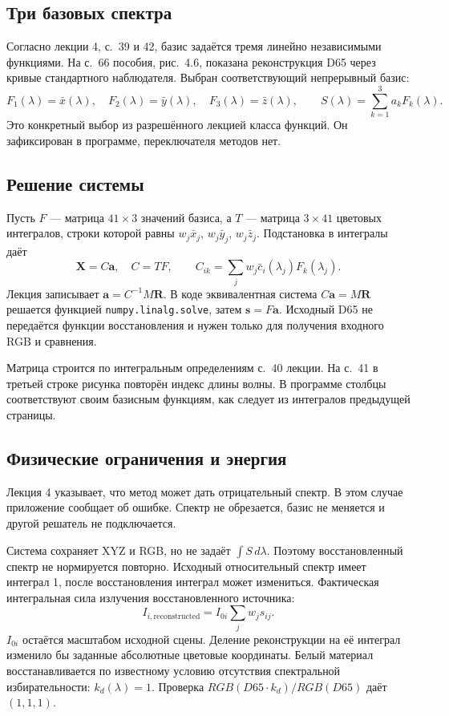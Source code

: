 \documentclass[a4paper,12pt]{article}
\newcommand{\code}[1]{\nolinkurl{#1}}
\begin{document}
\subsection{Три базовых спектра}
Согласно лекции 4, с.~39 и 42, базис задаётся тремя линейно независимыми функциями. На с.~66 пособия, рис.~4.6, показана реконструкция D65 через кривые стандартного наблюдателя. Выбран соответствующий непрерывный базис:
\[
 F_1(\lambda)=\bar x(\lambda),\quad F_2(\lambda)=\bar y(\lambda),\quad
 F_3(\lambda)=\bar z(\lambda),\qquad S(\lambda)=\sum_{k=1}^3a_kF_k(\lambda).
\]
Это конкретный выбор из разрешённого лекцией класса функций. Он зафиксирован в программе, переключателя методов нет.

\subsection{Решение системы}
Пусть $F$ --- матрица $41\times3$ значений базиса, а $T$ --- матрица $3\times41$ цветовых интегралов, строки которой равны $w_j\bar x_j$, $w_j\bar y_j$, $w_j\bar z_j$. Подстановка в интегралы даёт
\[
 \boldsymbol X=C\boldsymbol a,\quad C=TF,\qquad
 C_{ik}=\sum_jw_j\bar c_i(\lambda_j)F_k(\lambda_j).
\]
Лекция записывает $\boldsymbol a=C^{-1}M\boldsymbol R$. В коде эквивалентная система $C\boldsymbol a=M\boldsymbol R$ решается функцией \code{numpy.linalg.solve}, затем $\boldsymbol s=F\boldsymbol a$. Исходный D65 не передаётся функции восстановления и нужен только для получения входного RGB и сравнения.

Матрица строится по интегральным определениям с.~40 лекции. На с.~41 в третьей строке рисунка повторён индекс длины волны. В программе столбцы соответствуют своим базисным функциям, как следует из интегралов предыдущей страницы.

\subsection{Физические ограничения и энергия}
Лекция 4 указывает, что метод может дать отрицательный спектр. В этом случае приложение сообщает об ошибке. Спектр не обрезается, базис не меняется и другой решатель не подключается.

Система сохраняет XYZ и RGB, но не задаёт $\int S\,d\lambda$. Поэтому восстановленный спектр не нормируется повторно. Исходный относительный спектр имеет интеграл 1, после восстановления интеграл может измениться. Фактическая интегральная сила излучения восстановленного источника:
\[
 I_{i,\mathrm{reconstructed}}=I_{0i}\sum_jw_js_{ij}.
\]
$I_{0i}$ остаётся масштабом исходной сцены. Деление реконструкции на её интеграл изменило бы заданные абсолютные цветовые координаты. Белый материал восстанавливается по известному условию отсутствия спектральной избирательности: $k_d(\lambda)=1$. Проверка $RGB(D65\cdot k_d)/RGB(D65)$ даёт $(1,1,1)$.
\end{document}
